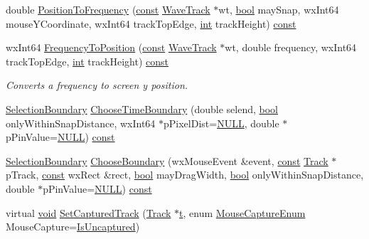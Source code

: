 \begin{DoxyCompactItemize}
\item 
double \hyperlink{class_track_panel_a93091b8efeeefbc10953a52175becc7e}{Position\+To\+Frequency} (\hyperlink{getopt1_8c_a2c212835823e3c54a8ab6d95c652660e}{const} \hyperlink{class_wave_track}{Wave\+Track} $\ast$wt, \hyperlink{mac_2config_2i386_2lib-src_2libsoxr_2soxr-config_8h_abb452686968e48b67397da5f97445f5b}{bool} may\+Snap, wx\+Int64 mouse\+Y\+Coordinate, wx\+Int64 track\+Top\+Edge, \hyperlink{xmltok_8h_a5a0d4a5641ce434f1d23533f2b2e6653}{int} track\+Height) \hyperlink{getopt1_8c_a2c212835823e3c54a8ab6d95c652660e}{const} 
\item 
wx\+Int64 \hyperlink{class_track_panel_a02a66231db305d328e5187723c67e3b4}{Frequency\+To\+Position} (\hyperlink{getopt1_8c_a2c212835823e3c54a8ab6d95c652660e}{const} \hyperlink{class_wave_track}{Wave\+Track} $\ast$wt, double frequency, wx\+Int64 track\+Top\+Edge, \hyperlink{xmltok_8h_a5a0d4a5641ce434f1d23533f2b2e6653}{int} track\+Height) \hyperlink{getopt1_8c_a2c212835823e3c54a8ab6d95c652660e}{const} 
\begin{DoxyCompactList}\small\item\em Converts a frequency to screen y position. \end{DoxyCompactList}\item 
\hyperlink{class_track_panel_a29bda3ec7c887e805fa032c215b8faef}{Selection\+Boundary} \hyperlink{class_track_panel_a90779078f1520016955e0d2bfe2e3dd1}{Choose\+Time\+Boundary} (double selend, \hyperlink{mac_2config_2i386_2lib-src_2libsoxr_2soxr-config_8h_abb452686968e48b67397da5f97445f5b}{bool} only\+Within\+Snap\+Distance, wx\+Int64 $\ast$p\+Pixel\+Dist=\hyperlink{px__mixer_8h_a070d2ce7b6bb7e5c05602aa8c308d0c4}{N\+U\+LL}, double $\ast$p\+Pin\+Value=\hyperlink{px__mixer_8h_a070d2ce7b6bb7e5c05602aa8c308d0c4}{N\+U\+LL}) \hyperlink{getopt1_8c_a2c212835823e3c54a8ab6d95c652660e}{const} 
\item 
\hyperlink{class_track_panel_a29bda3ec7c887e805fa032c215b8faef}{Selection\+Boundary} \hyperlink{class_track_panel_a38c1a22080626e8b1af8cce7fcf10dae}{Choose\+Boundary} (wx\+Mouse\+Event \&event, \hyperlink{getopt1_8c_a2c212835823e3c54a8ab6d95c652660e}{const} \hyperlink{class_track}{Track} $\ast$p\+Track, \hyperlink{getopt1_8c_a2c212835823e3c54a8ab6d95c652660e}{const} wx\+Rect \&rect, \hyperlink{mac_2config_2i386_2lib-src_2libsoxr_2soxr-config_8h_abb452686968e48b67397da5f97445f5b}{bool} may\+Drag\+Width, \hyperlink{mac_2config_2i386_2lib-src_2libsoxr_2soxr-config_8h_abb452686968e48b67397da5f97445f5b}{bool} only\+Within\+Snap\+Distance, double $\ast$p\+Pin\+Value=\hyperlink{px__mixer_8h_a070d2ce7b6bb7e5c05602aa8c308d0c4}{N\+U\+LL}) \hyperlink{getopt1_8c_a2c212835823e3c54a8ab6d95c652660e}{const} 
\item 
virtual \hyperlink{sound_8c_ae35f5844602719cf66324f4de2a658b3}{void} \hyperlink{class_track_panel_a01df8ee94d4a599a5831a15b4555c242}{Set\+Captured\+Track} (\hyperlink{class_track}{Track} $\ast$\hyperlink{octave__test_8m_aaccc9105df5383111407fd5b41255e23}{t}, enum \hyperlink{class_track_panel_acdcb15e30d6e6f19b6f566d40d573e7b}{Mouse\+Capture\+Enum} Mouse\+Capture=\hyperlink{class_track_panel_acdcb15e30d6e6f19b6f566d40d573e7bad35795d59fc54193830a64bd9f8ac166}{Is\+Uncaptured})
\end{DoxyCompactItemize}
